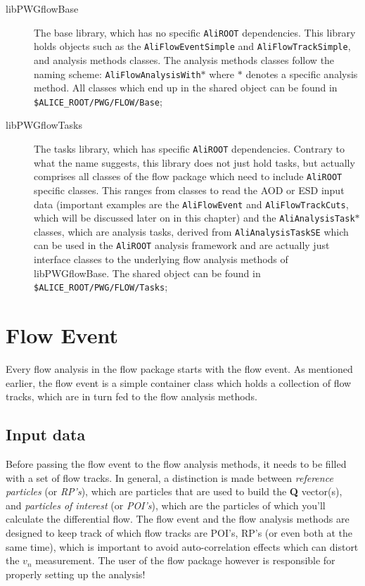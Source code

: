 \documentclass[a4paper]{book}
\numberwithin{equation}{subsection}
\begin{document}
\begin{description}
\item [libPWGflowBase] The base library, which has no specific \texttt{AliROOT} dependencies. This library holds objects such as the \texttt{AliFlowEventSimple} and \texttt{AliFlowTrackSimple}, and analysis methods classes. The analysis methods classes follow the naming scheme: \texttt{AliFlowAnalysisWith$\ast$} where $\ast$ denotes a specific analysis method. All classes which end up in the  shared object can be found in \texttt{\$ALICE\_ROOT/PWG/FLOW/Base};
\item [libPWGflowTasks] The tasks library, which has specific \texttt{AliROOT} dependencies. Contrary to what the name suggests, this library does not just hold tasks, but actually comprises all classes of the flow package which need to include \texttt{AliROOT} specific classes. This ranges from classes to read the AOD or ESD input data (important examples are the \texttt{AliFlowEvent} and \texttt{AliFlowTrackCuts}, which will be discussed later on in this chapter) and the \texttt{AliAnalysisTask$\ast$} classes, which are analysis tasks, derived from \texttt{AliAnalysisTaskSE} which can be used in the \texttt{AliROOT} analysis framework and are actually just interface classes to the underlying flow analysis methods of libPWGflowBase. The  shared object can be found in \texttt{\$ALICE\_ROOT/PWG/FLOW/Tasks};
\end{description}


\section{Flow Event}
Every flow analysis in the flow package starts with the flow event. As mentioned earlier, the flow event is a simple container class which holds a collection of flow tracks, which are in turn fed to the flow analysis methods. 
\subsection{Input data}
Before passing the flow event to the flow analysis methods, it needs to be filled with a set of flow tracks. In general, a distinction is made between \emph{reference particles} (or \emph{RP's}), which are particles that are used to build the \textbf{Q} vector(s), and \emph{particles of interest} (or \emph{POI's}), which are the particles of which you'll calculate the differential flow. The flow event and the flow analysis methods are designed to keep track of which flow tracks are POI's, RP's (or even both at the same time), which is important to avoid auto-correlation effects which can distort the $v_n$ measurement. The user of the flow package however is responsible for properly setting up the analysis! 
\end{document}
